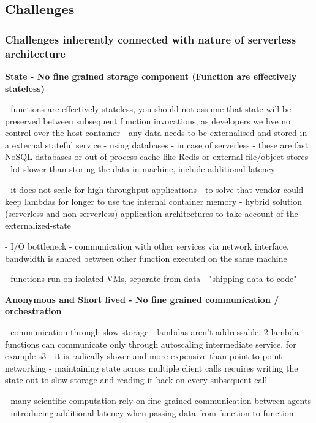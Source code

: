 \subsection{Challenges} 

\subsubsection*{Challenges inherently connected with nature of serverless architecture} 

\textbf{State - No fine grained storage component (Function are effectively stateless)} 

- functions are effectively stateless, you should not assume that state will be preserved between subsequent function invocations, as developers we hve no control over the host container - any data needs to be externalised and stored in a external stateful service
- using databases - in case of serverless - these are fast NoSQL databases or out-of-process cache like Redis or external file/object stores - lot slower than storing the data in machine, include additional latency

- it does not scale for high throughput applications - to solve that vendor could keep lambdas for longer to use the internal container memory
- hybrid solution (serverless and non-serverless) application architectures to take account of the externalized-state

- I/O bottleneck - communication with other services via network interface, bandwidth is shared between other function executed on the same machine

- functions run on isolated VMs, separate from data - "shipping data to code"


\textbf{Anonymous and Short lived - No fine grained communication / orchestration} 

- communication through slow storage - lambdas aren't addressable, 2 lambda functions can communicate only through autoscaling intermediate service, for example s3 - it is radically slower and more expensive than point-to-point networking - maintaining state across multiple client calls requires writing the state out to slow storage and reading it back on every subsequent call

- many scientific computation rely on fine-grained communication between agents - introducing additional latency when passing data from function to function

